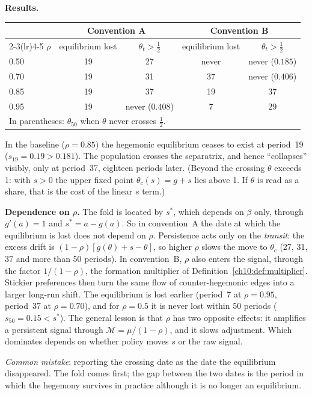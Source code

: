 \documentclass[../solutions_manual.tex]{subfiles}
\begin{document}
 \textbf{Results.}
\begin{center}
\small
\begin{tabular}{lcccc}
\toprule
& \multicolumn{2}{c}{Convention A} & \multicolumn{2}{c}{Convention B} \\
\cmidrule(lr){2-3}\cmidrule(lr){4-5}
$\rho$ & equilibrium lost & $\theta_t > \tfrac12$ & equilibrium lost & $\theta_t > \tfrac12$ \\
\midrule
0.50 & 19 & 27 & never & never ($0.185$) \\
0.70 & 19 & 31 & 37 & never ($0.406$) \\
0.85 & 19 & 37 & 19 & 37 \\
0.95 & 19 & never ($0.408$) & 7 & 29 \\
\bottomrule
\multicolumn{5}{l}{\footnotesize In parentheses: $\theta_{50}$ when $\theta$ never crosses $\tfrac12$.}
\end{tabular}
\end{center}
In the baseline ($\rho = 0.85$) the hegemonic equilibrium ceases to exist at period~19 ($s_{19} = 0.19 > 0.181$). The population crosses the separatrix, and hence ``collapses'' visibly, only at period~37, eighteen periods later. (Beyond the crossing $\theta$ exceeds 1: with $s > 0$ the upper fixed point $\theta_c(s) = g + s$ lies above 1. If $\theta$ is read as a share, that is the cost of the linear $s$ term.)

 \textbf{Dependence on $\rho$.} The fold is located by $s^*$, which depends on $\beta$ only, through $g'(a) = 1$ and $s^* = a - g(a)$. So in convention~A the date at which the equilibrium is lost does not depend on $\rho$. Persistence acts only on the \emph{transit}: the excess drift is $(1-\rho)[g(\theta) + s - \theta]$, so higher $\rho$ slows the move to $\theta_c$ (27, 31, 37 and more than 50 periods). In convention~B, $\rho$ also enters the signal, through the factor $1/(1-\rho)$, the formation multiplier of Definition~\ref{ch10:def:multiplier}. Stickier preferences then turn the same flow of counter-hegemonic edges into a larger long-run shift. The equilibrium is lost earlier (period~7 at $\rho = 0.95$, period~37 at $\rho = 0.70$), and for $\rho = 0.5$ it is never lost within 50 periods ($s_{50} = 0.15 < s^*$). The general lesson is that $\rho$ has two opposite effects: it amplifies a persistent signal through $\mathcal{M} = \mu/(1-\rho)$, and it slows adjustment. Which dominates depends on whether policy moves $s$ or the raw signal.

\emph{Common mistake}: reporting the crossing date as the date the equilibrium disappeared. The fold comes first; the gap between the two dates is the period in which the hegemony survives in practice although it is no longer an equilibrium.
\end{document}
